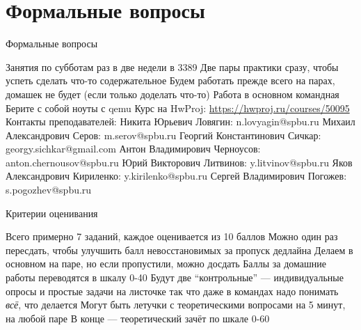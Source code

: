 \documentclass{../../slides-style}
\author[]{}
\begin{document}
    \begin{frame}[plain]
        \titlepage
    \end{frame}

    \section{Формальные вопросы}

    \begin{frame}{Формальные вопросы}
        \begin{outline}
            \1 Занятия по субботам раз в две недели в 3389
                \2 Две пары практики сразу, чтобы успеть сделать что-то содержательное
                \2 Будем работать прежде всего на парах, домашек не будет (если только доделать что-то)
                \2 Работа в основном командная
            \1 Берите с собой ноуты с qemu
            \1 Курс на HwProj: \url{https://hwproj.ru/courses/50095}
            \1 Контакты преподавателей:
                \2 Никита Юрьевич Ловягин: n.lovyagin@spbu.ru
                \2 Михаил Александрович Серов: m.serov@spbu.ru
                \2 Георгий Константинович Сичкар: georgy.sichkar@gmail.com
                \2 Антон Владимирович Черноусов: anton.chernousov@spbu.ru
                \2 Юрий Викторович Литвинов: y.litvinov@spbu.ru
                \2 Яков Александрович Кириленко: y.kirilenko@spbu.ru
                \2 Сергей Владимирович Погожев: s.pogozhev@spbu.ru
        \end{outline}
    \end{frame}

    \begin{frame}{Критерии оценивания}
        \begin{outline}
            \1 Всего примерно 7 заданий, каждое оценивается из 10 баллов
                \2 Можно один раз пересдать, чтобы улучшить балл
                 невосстановимых за пропуск дедлайна
                \2 Делаем в основном на паре, но если пропустили, можно досдать
            \1 Баллы за домашние работы переводятся в шкалу 0-40
            \1 Будут две \enquote{контрольные} --- индивидуальные опросы и простые задачи на листочке
                \2 так что даже в командах надо понимать \textit{всё}, что делается
            \1 Могут быть летучки с теоретическими вопросами на 5 минут, на любой паре
            \1 В конце --- теоретический зачёт по шкале 0-60
        \end{outline}
    \end{frame}
\end{document}
